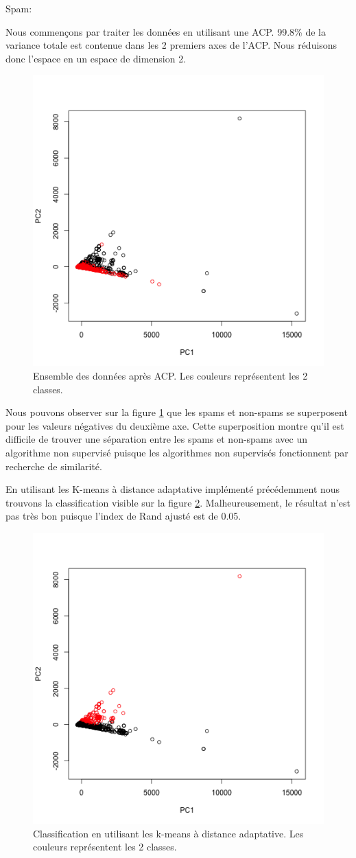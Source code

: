 \documentclass[a4paper,11pt,oneside,roman]{article}
\begin{document}
    Spam:

    Nous commençons par traiter les données en utilisant une ACP.
    99.8\% de la variance totale est contenue dans les 2 premiers axes de l'ACP.
    Nous réduisons donc l'espace en un espace de dimension 2.
    \begin{figure}
        \centering
        \includegraphics[width=.5\linewidth]{imgs/Spam_ACP.png}
        \caption{Ensemble des données après ACP. Les couleurs représentent les 2 classes.}
        \label{fig_spam_ACP}
    \end{figure}

    Nous pouvons observer sur la figure \ref{fig_spam_ACP} que les spams et non-spams se superposent pour les valeurs négatives du deuxième axe.
    Cette superposition montre qu'il est difficile de trouver une séparation entre les spams et non-spams avec un algorithme non supervisé puisque les algorithmes non supervisés fonctionnent par recherche de similarité.

    En utilisant les K-means à distance adaptative implémenté précédemment nous trouvons la classification visible sur la figure \ref{fig_spam_k_means_adaptative}.
    Malheureusement, le résultat n'est pas très bon puisque l'index de Rand ajusté est de 0.05.
    \begin{figure}
        \centering
        \includegraphics[width=.5\linewidth]{imgs/Spam_ACP_k_means_adaptative.png}
        \caption{Classification en utilisant les k-means à distance adaptative. Les couleurs représentent les 2 classes.}
        \label{fig_spam_k_means_adaptative}
    \end{figure}
\end{document}
